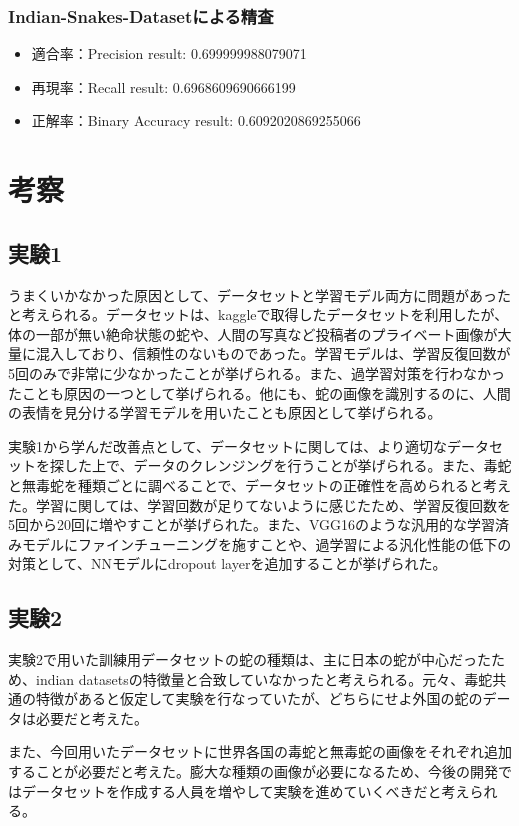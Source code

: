 \documentclass[a4paper, 11pt, titlepage]{jsarticle}
\begin{document}
\subsubsection{Indian-Snakes-Datasetによる精査}
\begin{itemize}
\item 適合率：Precision result: 0.699999988079071
\item 再現率：Recall result: 0.6968609690666199
\item 正解率：Binary Accuracy result: 0.6092020869255066
\end{itemize}

\section{考察}
\subsection{実験1}
うまくいかなかった原因として、データセットと学習モデル両方に問題があったと考えられる。データセットは、kaggleで取得したデータセットを利用したが、体の一部が無い絶命状態の蛇や、人間の写真など投稿者のプライベート画像が大量に混入しており、信頼性のないものであった。学習モデルは、学習反復回数が5回のみで非常に少なかったことが挙げられる。また、過学習対策を行わなかったことも原因の一つとして挙げられる。他にも、蛇の画像を識別するのに、人間の表情を見分ける学習モデルを用いたことも原因として挙げられる。\par
実験1から学んだ改善点として、データセットに関しては、より適切なデータセットを探した上で、データのクレンジングを行うことが挙げられる。また、毒蛇と無毒蛇を種類ごとに調べることで、データセットの正確性を高められると考えた。学習に関しては、学習回数が足りてないように感じたため、学習反復回数を5回から20回に増やすことが挙げられた。また、VGG16のような汎用的な学習済みモデルにファインチューニングを施すことや、過学習による汎化性能の低下の対策として、NNモデルにdropout layerを追加することが挙げられた。\par

\subsection{実験2}
実験2で用いた訓練用データセットの蛇の種類は、主に日本の蛇が中心だったため、indian datasetsの特徴量と合致していなかったと考えられる。元々、毒蛇共通の特徴があると仮定して実験を行なっていたが、どちらにせよ外国の蛇のデータは必要だと考えた。\par
また、今回用いたデータセットに世界各国の毒蛇と無毒蛇の画像をそれぞれ追加することが必要だと考えた。膨大な種類の画像が必要になるため、今後の開発ではデータセットを作成する人員を増やして実験を進めていくべきだと考えられる。
\end{document}
